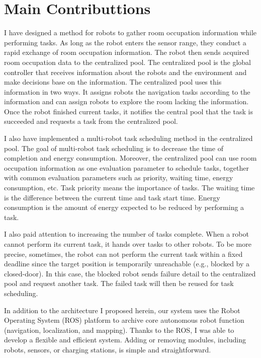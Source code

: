\section{Main Contributtions}

I have designed a method for robots to gather room occupation information while performing tasks. As long as the robot enters the sensor range, they conduct a rapid exchange of room occupation information. The robot then sends acquired room occupation data to the centralized pool. The centralized pool is the global controller that receives information about the robots and the environment and make decisions base on the information. The centralized pool uses this information in two ways. It assigns robots the navigation tasks according to the information and can assign robots to explore the room lacking the information. Once the robot finished current tasks, it notifies the central pool that the task is succeeded and requests a task from the centralized pool.

I also have implemented a multi-robot task scheduling method in the centralized pool. The goal of multi-robot task scheduling is to decrease the time of completion and energy consumption. Moreover, the centralized pool can use room occupation information as one evaluation parameter to schedule tasks, together with common evaluation parameters such as priority, waiting time, energy consumption, etc. Task priority means the importance of tasks. The waiting time is the difference between the current time and task start time. Energy consumption is the amount of energy expected to be reduced by performing a task.

I also paid attention to increasing the number of tasks complete. When a robot cannot perform its current task, it hands over tasks to other robots. To be more precise, sometimes, the robot can not perform the current task within a fixed deadline since the target position is temporarily unreachable (e.g., blocked by a closed-door). In this case, the blocked robot sends failure detail to the centralized pool and request another task. The failed task will then be reused for task scheduling. 


In addition to the architecture I proposed herein, our system uses the Robot Operating System (ROS) platform to archive core autonomous robot function (navigation, localization, and mapping). Thanks to the ROS, I was able to develop a flexible and efficient system. Adding or removing modules, including robots, sensors, or charging stations, is simple and straightforward.

